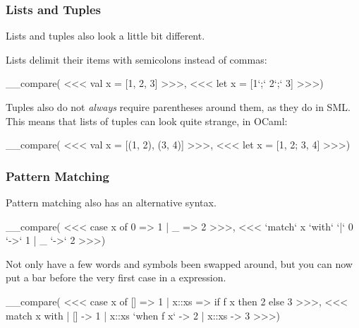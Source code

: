 \documentclass[aspectratio=169, handout]{beamer}
\begin{document}
\begin{frame}[fragile]
  \frametitle{Lists and Tuples}

  Lists and tuples also look a little bit different.

  \vspace{\fill}

  Lists delimit their items with semicolons instead of commas:

  \vspace{\fill}

  __compare(
<<<
val x = [1, 2, 3]
>>>,
<<<
let x = [1`;` 2`;` 3]
>>>)

  \vspace{\fill}

  Tuples also do not \textit{always} require parentheses around them, as
  they do in SML. This means that lists of tuples can look quite strange,
  in OCaml:

  \vspace{\fill}

  __compare(
<<<
  val x = [(1, 2), (3, 4)]
>>>,
<<<
  let x = [1, 2; 3, 4]
>>>)

\end{frame}

\begin{frame}[fragile]
  \frametitle{Pattern Matching}

  Pattern matching also has an alternative syntax.

  \vspace{\fill}

  __compare(
<<<
  case x of
    0 => 1
  | _ => 2
>>>,
<<<
  `match` x `with`
  `|` 0 `->` 1
  | _ `->` 2
>>>)

  Not only have a few words and symbols been swapped around, but you can now
  put a bar before the very first case in a  expression.

  \vspace{\fill}


  \vspace{\fill}

  __compare(
<<<
  case x of
    [] => 1
  | x::xs =>
      if f x then 2 else 3
>>>,
<<<
  match x with
  | [] -> 1
  | x::xs `when f x` -> 2
  | x::xs -> 3
>>>)
\end{frame}
\end{document}
